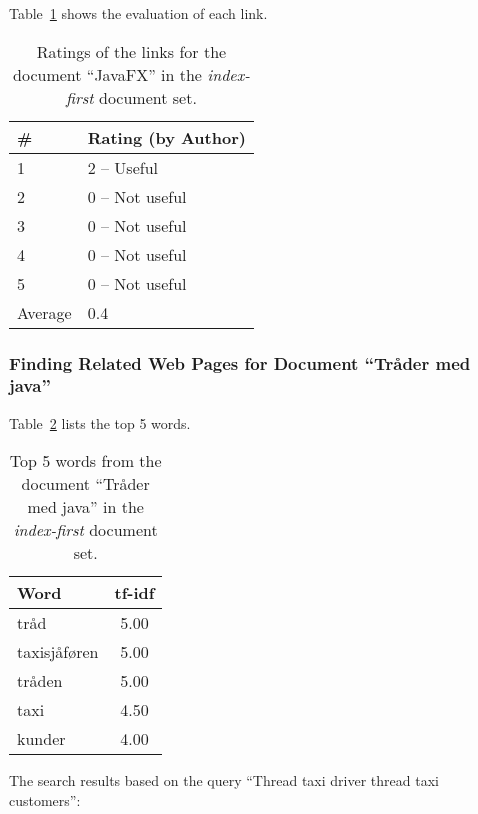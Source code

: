 Table~\ref{tab:ratings-no-javafx} shows the evaluation of each link.
\begin{table}[H]
\centering
\begin{tabular}{|l|l|}
\hline\hline
    \# & Rating (by Author) \\
\hline
    1 & 2 -- Useful \\
    2 & 0 -- Not useful \\
    3 & 0 -- Not useful \\
    4 & 0 -- Not useful \\
    5 & 0 -- Not useful \\
\hline
    Average & 0.4 \\
\hline\hline
\end{tabular}
\caption{Ratings of the links for the document ``JavaFX'' in the \textit{index-first} document set.}
\label{tab:ratings-no-javafx}
\end{table}



\subsubsection{Finding Related Web Pages for Document ``Tråder med java''}
\label{subsubsec:no-tr-der-med-java}

Table~\ref{tab:topWords-no-tr-der-med-java} lists the top 5 words.
\begin{table}[H]
\centering
\begin{tabular}{|l|c|}
\hline\hline
    Word & tf-idf \\
\hline
    tråd & 5.00 \\
    taxisjåføren & 5.00 \\
    tråden & 5.00 \\
    taxi & 4.50 \\
    kunder & 4.00 \\
\hline\hline
\end{tabular}
\caption{Top 5 words from the document ``Tråder med java'' in the \textit{index-first} document set.}
\label{tab:topWords-no-tr-der-med-java}
\end{table}

The search results based on the query ``Thread taxi driver thread taxi customers'':


